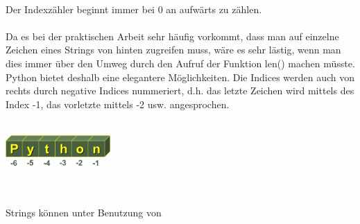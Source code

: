 \\
Der Indexzähler beginnt immer bei 0 an aufwärts zu zählen.\\
\\
Da es bei der praktischen Arbeit sehr häufig vorkommt, dass man auf einzelne Zeichen eines Strings von hinten zugreifen muss, wäre es sehr lästig, wenn man dies immer über den Umweg durch den Aufruf der Funktion len() machen müsste. Python bietet deshalb eine elegantere Möglichkeiten. Die Indices werden auch von rechts durch negative Indices nummeriert, d.h. das letzte Zeichen wird mittels des Index -1, das vorletzte mittels -2 usw. angesprochen. \\
\\
\begin{minipage}{-0.8\textwidth}
\centering
\includegraphics[width=4cm, height=1.2cm]{pics/string_indices_negative.png}
\label{fig:string_indices_negative}
\end{minipage} \\
\\
Strings können unter Benutzung von\\
